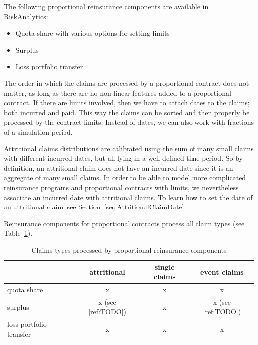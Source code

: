 The following proportional reinsurance components are available in RiskAnalytics:
\begin{itemize}
						\item Quota share with various options for setting limits
						\item Surplus
						\item Loss portfolio transfer
\end{itemize}

The order in which the claims are processed by a proportional contract does not matter, as long as there are no non-linear features added to a proportional contract. 
If there are limits involved, then we have to attach dates to the claims; both incurred and paid. This way the claims can be sorted and then properly be processed by the contract limits. Instead of dates, we can also work with fractions of a simulation period. 


Attritional claims distributions are calibrated using the sum of many small claims with different incurred dates, but all lying in a well-defined time period. So by definition, an attritional claim does not have an incurred date since it is an aggregate of many small claims. In order to be able to model more complicated reinsurance programs and proportional contracts with limits, we nevertheless associate an incurred date with attritional claims. To learn how to set the date of an attritional claim, see Section~\ref{sec:AttritionalClaimDate}.

Reinsurance components for proportional contracts process all claim types (see Table~\ref{tab:ClaimsTypesProcessedByProportionalReinsuranceComponents}).
\begin{table}[h]
	\centering
		\begin{tabular}{l|c|c|c|}
		\cline{2-4}
		& attritional & single claims & event claims \\
		\hline \multicolumn{1}{|l|}{quota share} & x & x & x \\
		\hline \multicolumn{1}{|l|}{surplus} & x (see \ref{ref:TODO}) & x & x (see \ref{ref:TODO}) \\
		\hline \multicolumn{1}{|l|}{loss portfolio transfer} & x & x & x \\
		\hline
		\end{tabular}
	\caption{Claims types processed by proportional reinsurance components}
	\label{tab:ClaimsTypesProcessedByProportionalReinsuranceComponents}
\end{table}

